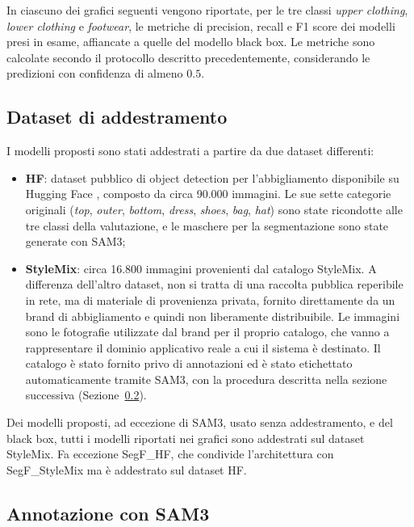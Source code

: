 \noindent
In ciascuno dei grafici seguenti vengono riportate, per le tre classi \textit{upper clothing}, \textit{lower clothing} e \textit{footwear}, le metriche di precision, recall e F1 score
dei modelli presi in esame, affiancate a quelle del modello black box. Le metriche sono calcolate secondo il protocollo descritto precedentemente, considerando le predizioni con confidenza di almeno $0.5$.

\subsection{Dataset di addestramento}

\noindent
I modelli proposti sono stati addestrati a partire da due dataset differenti:
\begin{itemize}
  \item \textbf{HF}: dataset pubblico di object detection per l'abbigliamento disponibile su Hugging Face \cite{HF_dataset}, composto da circa 90.000 immagini.
        Le sue sette categorie originali (\textit{top}, \textit{outer}, \textit{bottom}, \textit{dress}, \textit{shoes}, \textit{bag}, \textit{hat}) sono state ricondotte alle tre classi della valutazione,
        e le maschere per la segmentazione sono state generate con SAM3;
  \item \textbf{StyleMix}: circa 16.800 immagini provenienti dal catalogo StyleMix. A differenza dell'altro dataset, non si tratta di una raccolta pubblica reperibile in rete,
        ma di materiale di provenienza privata, fornito direttamente da un brand di abbigliamento e quindi non liberamente distribuibile.
        Le immagini sono le fotografie utilizzate dal brand per il proprio catalogo, che vanno a rappresentare il dominio applicativo reale a cui il sistema è destinato.
        Il catalogo è stato fornito privo di annotazioni ed è stato etichettato automaticamente tramite SAM3, con la procedura descritta nella sezione successiva (Sezione~\ref{sec:sam3_annotation}).
\end{itemize}

\noindent
Dei modelli proposti, ad eccezione di SAM3, usato senza addestramento, e del black box, tutti i modelli riportati nei grafici sono addestrati sul dataset StyleMix.
Fa eccezione SegF\_HF, che condivide l'architettura con SegF\_StyleMix ma è addestrato sul dataset HF.

\newpage

\subsection{Annotazione con SAM3}
\label{sec:sam3_annotation}


